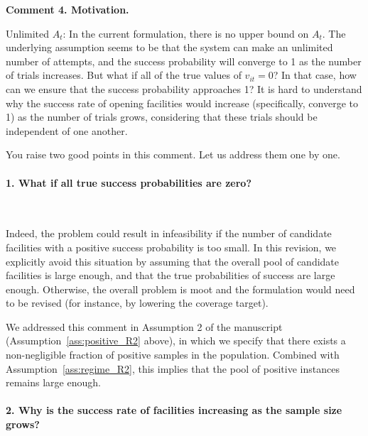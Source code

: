 \documentclass[11pt]{article}
\begin{document}
\begin{commentBox}
    \textbf{Comment 4. Motivation.}\label{R2:4}

    Unlimited $A_t$: In the current formulation, there is no upper bound on $A_t$. The underlying assumption seems to be that the system can make an unlimited number of attempts, and the success probability will converge to 1 as the number of trials increases. But what if all of the true values of $v_{it} = 0$? In that case, how can we ensure that the success probability approaches 1? It is hard to understand why the success rate of opening facilities would increase (specifically, converge to 1) as the number of trials grows, considering that these trials should be independent of one another.
\end{commentBox}

You raise two good points in this comment. Let us address them one by one.

\paragraph{1. What if all true success probabilities are zero?}\

Indeed, the problem could result in infeasibility if the number of candidate facilities with a positive success probability is too small. In this revision, we explicitly avoid this situation by assuming that the overall pool of candidate facilities is large enough, and that the true probabilities of success are large enough. Otherwise, the overall problem is moot and the formulation would need to be revised (for instance, by lowering the coverage target).

We addressed this comment in Assumption 2 of the manuscript (Assumption~\ref{ass:positive_R2} above), in which we specify that there exists a non-negligible fraction of positive samples in the population. Combined with Assumption~\ref{ass:regime_R2}, this implies that the pool of positive instances remains large enough.

\paragraph{2. Why is the success rate of facilities increasing as the sample size grows?}\
\end{document}
